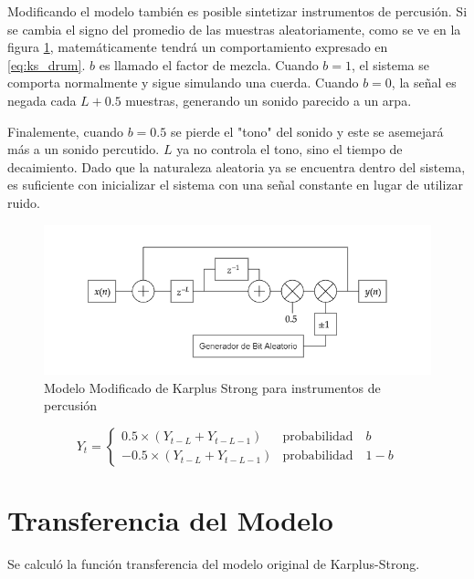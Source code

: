 Modificando el modelo también es posible sintetizar instrumentos de percusión. Si se cambia el signo del promedio de las muestras aleatoriamente, como se ve en la figura \ref{fig:ks_drum}, matemáticamente tendrá un comportamiento expresado en \eqref{eq:ks_drum}. $b$ es llamado el factor de mezcla. Cuando $b=1$, el sistema se comporta normalmente y sigue simulando una cuerda. Cuando $b=0$, la señal es negada cada $L+0.5$ muestras, generando un sonido parecido a un arpa.

Finalemente, cuando $b=0.5$ se pierde el "tono" del sonido y este se asemejará más a un sonido percutido. $L$ ya no controla el tono, sino el tiempo de decaimiento. Dado que la naturaleza aleatoria ya se encuentra dentro del sistema, es suficiente con inicializar el sistema con una señal constante en lugar de utilizar ruido.

\begin{figure}[ht]
    \centering
    \includegraphics[width = \linewidth]{res/fig_ks_drum.png}
    \caption{Modelo Modificado de Karplus Strong para instrumentos de percusión}
    \label{fig:ks_drum}
\end{figure}

\begin{equation}
    Y_t = 
    \begin{cases}
        0.5\times \left(Y_{t-L}+Y_{t-L-1}\right) &   \text{probabilidad} \quad b \\
        -0.5\times \left(Y_{t-L}+Y_{t-L-1}\right) &   \text{probabilidad} \quad 1-b
    \end{cases}
    \label{eq:ks_drum}
\end{equation}

\section{Transferencia del Modelo}

Se calculó la función transferencia del modelo original de Karplus-Strong.

